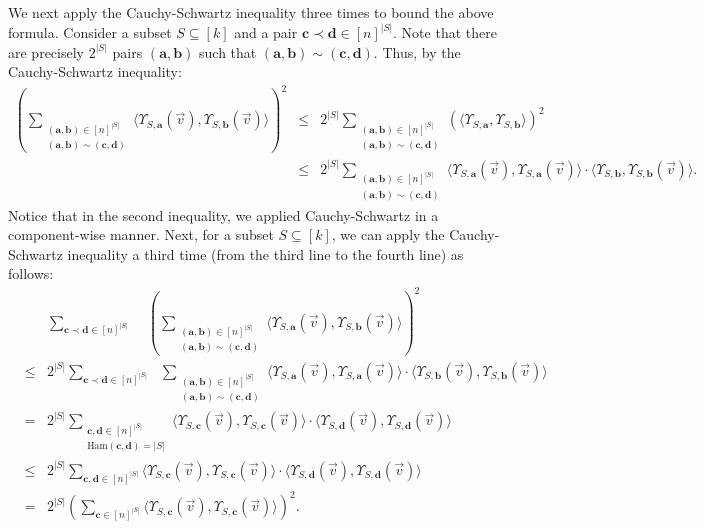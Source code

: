 \def\draft{0}  \documentclass[proceedings]{stacs}
\theoremstyle{plain}\newtheorem{satz}[thm]{Satz}
\theoremstyle{definition}\newtheorem{crucial}[thm]{Crucial Definition}
\newcommand{\vecv}{{\vec{v}} }
\newcommand{\bfa}{{\mathbf a} }
\newcommand{\bfb}{{\mathbf b} }
\newcommand{\bfc}{{\mathbf c} }
\newcommand{\bfd}{{\mathbf d} }
\begin{document}
We next apply the Cauchy-Schwartz inequality three times to bound the above formula. Consider a subset $S \subseteq [k]$ and a pair $\bfc \prec \bfd \in [n]^{|S|}$. Note that there are precisely $2^{|S|}$ pairs $(\bfa,\bfb)$ such that $(\bfa, \bfb)\sim (\bfc, \bfd)$. Thus, by the Cauchy-Schwartz inequality:
\begin{eqnarray*}
 \left(\sum_{\substack{(\bfa, \bfb) \in [n]^{|S|} \\(\bfa, \bfb)\sim (\bfc, \bfd)}} \langle\Upsilon_{S,\bfa}(\vecv), \Upsilon_{S,\bfb}(\vec v)\rangle\right)^2 &\leq& 2^{|S|} \sum_{\substack{(\bfa, \bfb) \in [n]^{|S|}\\ (\bfa, \bfb)\sim (\bfc, \bfd)}} (\langle\Upsilon_{S,\bfa}, \Upsilon_{S,\bfb}\rangle)^2 \\
 &\leq & 2^{|S|}\sum_{\substack{(\bfa,\bfb) \in [n]^{|S|}\\ (\bfa, \bfb)\sim (\bfc,\bfd)}} \langle\Upsilon_{S,\bfa}(\vecv), \Upsilon_{S,\bfa}(\vecv)\rangle\cdot\langle\Upsilon_{S,\bfb}, \Upsilon_{S, \bfb}(\vecv)\rangle.
\end{eqnarray*}
Notice that in the second inequality, we applied Cauchy-Schwartz in a component-wise manner.
Next, for a subset $S \subseteq [k]$, we can apply the Cauchy-Schwartz inequality a third time (from the third line to the fourth line) as follows:
\begin{eqnarray*}
& & \sum_{\bfc \prec \bfd \in [n]^{|S|}} \ \ \ \ \  \left(\sum_{\substack{(\bfa, \bfb) \in [n]^{|S|}\\ (\bfa, \bfb)\sim (\bfc, \bfd)}} \langle\Upsilon_{S,\bfa}(\vec v), \Upsilon_{S,\bfb}(\vec v)\rangle\right)^2 \\
& \leq & 2^{|S|}\sum_{\bfc \prec \bfd \in [n]^{|S|}} \ \ \ \sum_{\substack{(\bfa,\bfb) \in [n]^{|S|}\\ (\bfa, \bfb)\sim (\bfc,\bfd)}} \langle\Upsilon_{S,\bfa}(\vec v), \Upsilon_{S,\bfa}(\vec v)\rangle\cdot\langle\Upsilon_{S,\bfb}(\vec v), \Upsilon_{S, \bfb}(\vec v)\rangle \\
& = & 2^{|S|}\sum_{\substack{\bfc, \bfd \in [n]^{|S|}\\ \mathrm{Ham}(\bfc, \bfd) = |S|}} \langle\Upsilon_{S,\bfc}(\vec v), \Upsilon_{S,\bfc}(\vec v)\rangle\cdot\langle\Upsilon_{S, \bfd}(\vec v), \Upsilon_{S, \bfd}(\vec v)\rangle \\
& \leq & 2^{|S|}\sum_{\bfc,\bfd \in [n]^{|S|} } \langle\Upsilon_{S,\bfc}(\vec v), \Upsilon_{S,\bfc}(\vec v)\rangle\cdot\langle\Upsilon_{S, \bfd}(\vec v), \Upsilon_{S, \bfd}(\vec v)\rangle \\
& = & 2^{|S|}\left(\sum_{\bfc \in [n]^{|S|}} \langle\Upsilon_{S,\bfc}(\vec v), \Upsilon_{S,\bfc}(\vec v)\rangle\right)^2.
\end{eqnarray*}
\end{document}
